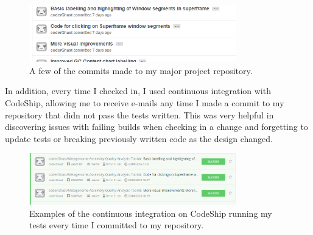 \begin{figure}[H]
\centering
\includegraphics[width=0.8\textwidth]{images/commits}
\caption{A few of the commits made to my major project repository.}
\end{figure}

In addition, every time I checked in, I used continuous integration with CodeShip\cite{codeship}, allowing me to receive e-mails any time I made a commit to my repository that didn not pass the tests written. This was very helpful in discovering issues with failing builds when checking in a change and forgetting to update tests or breaking previously written code as the design changed.

\begin{figure}[H]
\centering
\includegraphics[width=0.8\textwidth]{images/codeship}
\caption{Examples of the continuous integration on CodeShip running my tests every time I committed to my repository.}
\end{figure}